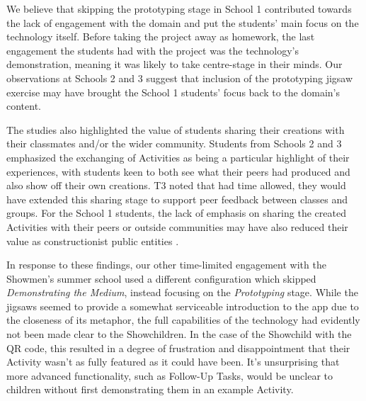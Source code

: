 We believe that skipping the prototyping stage in School 1 contributed towards the lack of engagement with the domain and put the students' main focus on the technology itself. Before taking the project away as homework, the last engagement the students had with the project was the technology's demonstration, meaning it was likely to take centre-stage in their minds. Our observations at Schools 2 and 3 suggest that inclusion of the prototyping jigsaw exercise may have brought the School 1 students' focus back to the domain's content.

The studies also highlighted the value of students sharing their creations with their classmates and/or the wider community. Students from Schools 2 and 3 emphasized the exchanging of Activities as being a particular highlight of their experiences, with students keen to both see what their peers had produced and also show off their own creations. T3 noted that had time allowed, they would have extended this sharing stage to support peer feedback between classes and groups. For the School 1 students, the lack of emphasis on sharing the created Activities with their peers or outside communities may have also reduced their value as constructionist public entities \cite{PapertSeymourandHarel1991a}.

In response to these findings, our other time-limited engagement with the Showmen's summer school used a different configuration which skipped \textit{Demonstrating the Medium}, instead focusing on the \textit{Prototyping} stage. While the jigsaws seemed to provide a somewhat serviceable introduction to the app due to the closeness of its metaphor, the full capabilities of the technology had evidently not been made clear to the Showchildren. In the case of the Showchild with the QR code, this resulted in a degree of frustration and disappointment that their Activity wasn't as fully featured as it could have been. It's unsurprising that more advanced functionality, such as Follow-Up Tasks, would be unclear to children without first demonstrating them in an example Activity.

